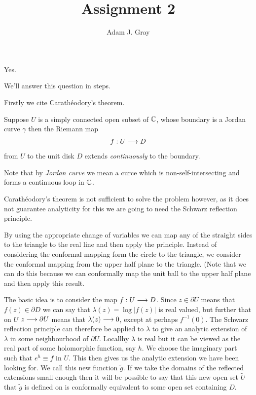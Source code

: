 \documentclass{unswmaths}
\begin{document}
\author{Adam J. Gray}
\title{Assignment 2}
\subject{Complex Analysis}

\newcommand{\llra}{\Leftrightarrow}

\unswtitle

\section{}

\begin{center}
	Yes.
\end{center}

We'll answer this question in steps.

Firstly we cite Carath{\'e}odory's theorem.

\begin{theorem}
Suppose $ U $ is a simply connected open subset of $ \mathbb{C} $, whose boundary is a Jordan curve $ \gamma $ then the Riemann map
\begin{align}
	f:U\longrightarrow D
\end{align}
from $ U $ to the unit disk $ D $ extends \emph{continuously} to the boundary.
\end{theorem}
Note that  by \emph{Jordan curve} we mean a curce which is non-self-intersecting and forms a continuous loop in $ \mathbb{C} $. 

Carath{\'e}odory's theorem is not sufficient to solve the problem however, as it does not guarantee analyticity for this we are going to need the Schwarz reflection principle. 

By using the appropriate change of variables we can map any of the straight sides to the triangle to the real line and then apply the principle.
Instead of considering the conformal mapping form the circle to the triangle, we consider the conformal mapping from the upper half plane to the triangle. (Note that we can do this because we can conformally map the unit ball to the upper half plane and then apply this result.

The basic idea is to consider the map $ f : U \longrightarrow D $. Since $ z \in \partial U $ means that $ f(z) \in \partial D $ we can say that $ \lambda(z) = \log|f(z)| $ is real valued, but further that on $ U $ $ z \longrightarrow \partial U $ means that $ \lambda(z) \longrightarrow 0 $, except at perhaps $f^{-1}(0) $. The Schwarz reflection principle can therefore be applied to  $ \lambda $ to give an analytic extension of $ \lambda $ in some neighbourhood of $ \partial U $. Locallhy $ \lambda $ is real but it can be viewed as the real part of some holomorphic function, say $ h $. We choose the imaginary part such that $ e^h \equiv f $ in $ U $. This then gives us the analytic extension we have been looking for. We call this new function $ \tilde{g} $.  If we take the domains of the reflected extensions small enough then it will be possible to say that this new open set $ \tilde{U} $ that $ \tilde{g} $ is defined on is conformally equivalent to some open set containing $ D $. 
\newline
\end{document}
